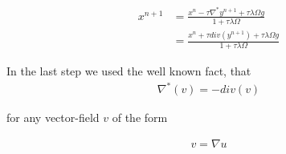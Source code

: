 \begin{align}
	x^{n+1} 
	&= \frac{x^n - \tau \nabla^* y^{n+1} +  \tau \lambda \Omega g}{1+\tau \lambda \Omega} \nonumber \\
	&= \frac{x^n + \tau div(y^{n+1}) +  \tau \lambda \Omega g}{1+\tau \lambda \Omega}
\label{eq:update_x_n_p_1}	
\end{align}

In the last step we used the well known fact, that 
\begin{align}
	\nabla^* (v) = -div(v)
\end{align}

for any vector-field $v$ of the form 

\begin{align}
	v = \nabla u
\end{align}


